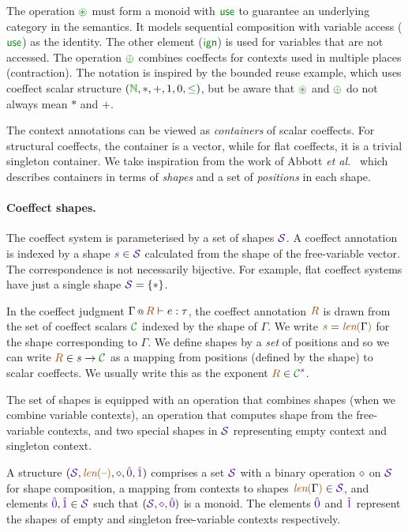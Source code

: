 \noindent
The operation $\cseq$ must form a monoid with $\cunit$ to guarantee an underlying 
category in the semantics. 
It models sequential composition with variable access
($\cunit$) as the identity. The other element ($\czero$) is used for
variables that are not accessed. The operation $\cpar$ combines coeffects
for contexts used in multiple places (contraction). 
The notation is inspired by the bounded reuse example, which uses coeffect scalar structure
$(\cclrd{\mathbb{N}}, \ast, +, 1,0, \cclrd{\leq})$, but be aware that $\cseq$ and $\cpar$ do
not always mean $\ast$ and $+$.

The context annotations can be viewed as \emph{containers} of scalar coeffects.
For structural coeffects, the container is a vector, while for flat coeffects, it is
a trivial singleton container. We take inspiration from the work of Abbott \emph{et al.}~\cite{types-containers}
which describes containers in terms of \emph{shapes} and a set of \emph{positions} in each shape.

\paragraph{Coeffect shapes.}
The coeffect system is parameterised by a set of shapes $\SH$. A coeffect annotation 
is indexed by a shape $\sclrd{s} \in \SH$ calculated from the shape of the free-variable vector. The correspondence is not necessarily 
bijective. For example, flat coeffect systems have just a single shape $\SH = \{ \ast \}$.

In the coeffect judgment $\coctx{\Gamma}{\aclrd{R}} \vdash e : \tau$, the coeffect annotation
$\aclrd{R}$ is drawn from the set of coeffect scalars $\C$ indexed by the shape of $\Gamma$.
We write $\aclrd{s} = \slift{\Gamma}$ for the shape corresponding to $\Gamma$. We define shapes by a 
\emph{set} of positions and so we can write $\aclrd{R} \in \sclrd{s} \rightarrow \C$ as a
mapping from positions (defined by the shape) to scalar coeffects. We usually write this as 
the exponent $\aclrd{R} \in \C^{\sclrd{s}}$.

The set of shapes is equipped with an operation that combines shapes (when we combine 
variable contexts), an operation that computes shape from the free-variable contexts, 
and two special shapes in $\SH$ representing empty context and singleton context. 

\begin{definition}
  A \emph{} structure $(\SH, \slift{\textnormal{--}}, \stimes,
  \sempty, \sunit)$ comprises a set $\SH$ with a binary operation
  $\stimes$ on $\SH$ for shape composition, a mapping from contexts to
  shapes $\slift{\Gamma} \in \SH$, and elements $\sempty,\sunit \in
  \SH$ such that $(\SH, \stimes, \sempty)$ is a monoid. The 
  elements $\sempty$ and $\sunit$ represent the shapes of empty and
  singleton free-variable contexts respectively.
\end{definition}

